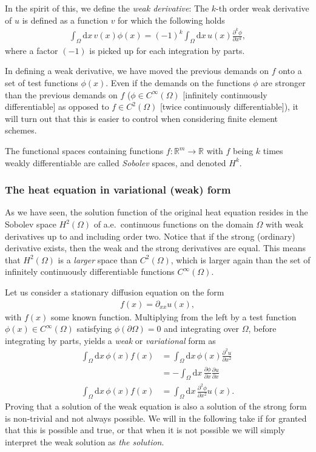 \documentclass[a4paper, twocolumn]{article}
\begin{document}
In the spirit of this, we define the \textit{weak derivative}: The $k$-th order weak derivative of $u$ is defined as a function $v$ for which the following holds
\begin{align}
\int_\Omega \mathrm{d}x\, v(x)\phi(x) = (-1)^k \int_\Omega\mathrm{d}x\, u(x)\frac{\partial^k \phi}{\partial x^k},
\end{align}
where a factor $(-1)$ is picked up for each integration by parts. 

In defining a weak derivative, we have moved the previous demands on $f$ onto a set of test functions $\phi(x)$. Even if the demands on the functions $\phi$ are stronger than the previous demands on $f$ ($\phi\in C^\infty(\Omega)$ [infinitely continuously differentiable] as opposed to $f\in C^2(\Omega)$ [twice continuously differentiable]), it will turn out that this is easier to control when considering finite element schemes. 

The functional spaces containing functions $f:\mathds{R}^m\rightarrow\mathds{R}$ with $f$ being $k$ times weakly differentiable are called \textit{Sobolev} spaces, and denoted $H^k$. 

\subsubsection{The heat equation in variational (weak) form}
As we have seen, the solution function of the original heat equation resides in the Sobolev space $H^2(\Omega)$ of a.e.\ continuous functions on the domain $\Omega$ with weak derivatives up to and including order two. Notice that if the strong (ordinary) derivative exists, then the weak and the strong derivatives are equal. This means that $H^2(\Omega)$ is a \textit{larger} space than $C^2(\Omega)$, which is larger again than the set of infinitely continuously differentiable functions $C^\infty(\Omega)$.

Let us consider a stationary diffusion equation on the form
\begin{align}
f(x)=\partial_{xx}u(x), \label{eq:stationary}
\end{align} 
with $f(x)$ some known function. Multiplying from the left by a test function $\phi(x)\in C^\infty(\Omega)$ satisfying $\phi(\partial\Omega)=0$ and integrating over $\Omega$, before integrating by parts, yields a \textit{weak} or \textit{variational} form as
\begin{align}
\int_\Omega\mathrm{d}x\, \phi(x)f(x) &= \int_\Omega \mathrm{d}x\, \phi(x)\frac{\partial^2 u}{\partial x^2} \nonumber \\
%
&= -\int_\Omega \mathrm{d}x\, \frac{\partial \phi}{\partial x}\frac{\partial u}{\partial x} \label{eq:weak1} \\
%
\int_\Omega\mathrm{d}x\, \phi(x)f(x) &=  \int_\Omega \mathrm{d}x\, \frac{\partial^2 \phi}{\partial x^2}u(x). \label{eq:weak2}
\end{align}
Proving that a solution of the weak equation is also a solution of the strong form is non-trivial and not always possible. We will in the following take if for granted that this is possible and true, or that when it is not possible we will simply interpret the weak solution as \textit{the solution}. 
\end{document}
